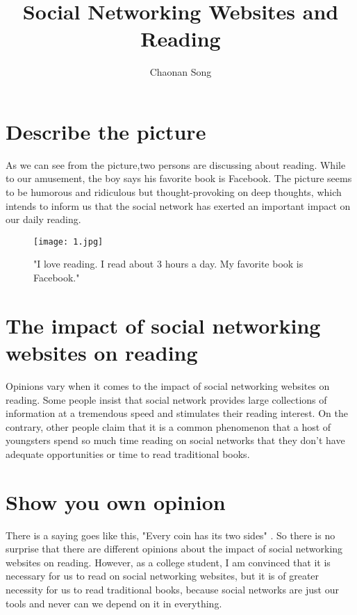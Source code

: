 \documentclass{article}
\title{Social Networking Websites and Reading}
\author{Chaonan Song}
\begin{document}
\maketitle
\section{Describe the picture}
    \par As we can see from the picture,two persons are discussing about reading. While to our amusement, the boy says his favorite book is Facebook. The picture seems to be humorous and ridiculous but thought-provoking on deep thoughts, which intends to inform us that the social network has exerted an important impact on our daily reading.
\begin{figure}[H]
  \centering
  \texttt{[image: 1.jpg]}
  \caption{"I love reading. I read about 3 hours a day. My favorite book is Facebook."}
  \label{fig:1}
\end{figure}
\section{The impact of social networking websites on reading}
    \par Opinions vary when it comes to the impact of social networking  websites on reading. Some people insist that social network provides large collections of information at a tremendous speed and stimulates their reading interest. On the contrary, other people claim that it is a common phenomenon that a host of youngsters spend so much time reading on social networks that they don't have adequate opportunities or time to read traditional books.
\section{Show you own opinion}
    \par There is a saying goes like this, "Every coin has its two sides" . So there is no surprise that there are different opinions about the impact of social networking websites on reading. However, as a college student, I am convinced that it is necessary for us to read on social networking websites,  but it is of greater necessity for us to read traditional books, because social networks are just our tools and never can we depend on it in everything.
\end{document}
